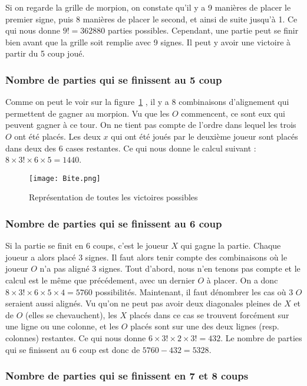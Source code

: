 \documentclass{article}
\begin{document}
Si on regarde la grille de morpion, on constate qu'il y a 9 manières de placer le premier signe, puis 8 manières de placer le second, et ainsi de suite jusqu'à 1. Ce qui nous donne $9! = 362880$ parties possibles. Cependant, une partie peut se finir bien avant que la grille soit remplie avec 9 signes. Il peut y avoir une victoire à partir du 5 coup joué.

\subsubsection{Nombre de parties qui se finissent au 5 coup}
Comme on peut le voir sur la figure~\ref{win}
, il y a 8 combinaisons d'alignement qui permettent de gagner au morpion. Vu que les $O$ commencent, ce sont eux qui peuvent gagner à ce tour. On ne tient pas compte de l'ordre dans lequel les trois $O$ ont été placés. Les deux $x$ qui ont été joués par le deuxième joueur sont placés dans deux des 6 cases restantes. Ce qui nous donne le calcul suivant : $8 \times 3! \times 6 \times 5 = 1440$.

\begin{figure}[!h]
\centering
\texttt{[image: Bite.png]}
\caption{Représentation de toutes les victoires possibles}
\label{win}
\end{figure}

\subsubsection{Nombre de parties qui se finissent au 6 coup}

Si la partie se finit en 6 coups, c'est le joueur $X$ qui gagne la partie. Chaque joueur a alors placé 3 signes. Il faut alors tenir compte des combinaisons où le joueur $O$ n'a pas aligné 3 signes. Tout d'abord, nous n'en tenons pas compte et le calcul est le même que précédement, avec un dernier $O$ à placer. On a donc $8 \times 3! \times 6 \times 5 \times 4 = 5760$ possibilités. Maintenant, il faut dénombrer les cas où 3 $O$ seraient aussi alignés. Vu qu'on ne peut pas avoir deux diagonales pleines de $X$ et de $O$ (elles se chevauchent), les $X$ placés dans ce cas se trouvent forcément sur une ligne ou une colonne, et les $O$ placés sont sur une des deux lignes (resp. colonnes) restantes. Ce qui nous donne $6 \times 3! \times 2 \times 3! = 432$. Le nombre de parties qui se finissent au 6 coup est donc de $5760 - 432 = 5328$.

\subsubsection{Nombre de parties qui se finissent en 7 et 8 coups}
\end{document}
